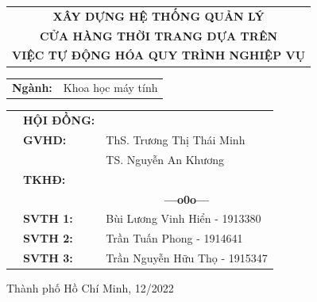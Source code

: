 \documentclass[a4paper, twoside, 12pt]{report}
\theoremstyle{definition}
\newcommand{\setupfont}[1]{\fontsize{#1}{#1}\selectfont}
\begin{document}
\begin{titlepage}
	\vspace*{0.5cm}

	\begin{center}
		\setupfont{17pt}
		\begin{tabular}{c}
			\textbf{{XÂY DỰNG HỆ THỐNG QUẢN LÝ}}    \\
			\textbf{{CỬA HÀNG THỜI TRANG DỰA TRÊN}} \\
			\textbf{{VIỆC TỰ ĐỘNG HÓA QUY TRÌNH NGHIỆP VỤ}}
		\end{tabular}
	\end{center}

	\vspace{0.5cm}


	\begin{center}
		\setupfont{14pt}
		\begin{tabular}{rl}
			\textbf{Ngành:} & Khoa học máy tính
		\end{tabular}
	\end{center}

	\vspace{1cm}

	\begin{table}[h]
		\setupfont{13pt}
		\begin{tabular}{rll}
			\hspace{5 cm} & \textbf{HỘI ĐỒNG:} &                                              \\
			              & \textbf{GVHD:}     & ThS. Trương Thị Thái Minh                    \\
			              &                    & TS. Nguyễn An Khương                         \\
			              & \textbf{TKHĐ:}     &                                              \\
			              &                    & \multicolumn{1}{c}{\bf---o0o---}\vspace{2mm} \\
			              & \textbf{SVTH 1:}   & Bùi Lương Vinh Hiển - 1913380                \\
			              & \textbf{SVTH 2:}   & Trần Tuấn Phong - 1914641                    \\
			              & \textbf{SVTH 3:}   & Trần Nguyễn Hữu Thọ - 1915347                \\
		\end{tabular}
	\end{table}

	\begin{center}
		{\setupfont{12pt} Thành phố Hồ Chí Minh, 12/2022}
	\end{center}
\end{titlepage}
\end{document}
